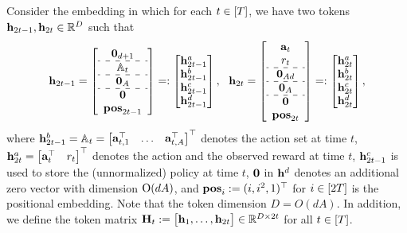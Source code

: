 Consider the embedding in which for each $t\in[{T}]$, we have two tokens ${\mathbf h}_{2t-1},{\mathbf h}_{2t}\in\mathbb{R}^D$ such that
\[
\begin{aligned}
\bh_{2t-1}=
\left[
\begin{array}{c}
     \bzero_{d+1} \\
     \hdashline
     \sA_t\\
     \hdashline
     \bzero_A\\
     \hdashline
      \bzero\\ \posv_{2t-1}
\end{array}
\right]
=:
\begin{bmatrix}
     \bh_{2t-1}^{\parta} \\  \bh_{2t-1}^{\partb}\\  \bh_{2t-1}^{\partc}\\   \bh_{2t-1}^{\partd}\\
\end{bmatrix},~~
\bh_{2t}=
\left[
\begin{array}{cc}
     \ba_{t} \\
      r_t\\
      \hdashline
       \bzero_{Ad}\\
       \hdashline
       \bzero_{A}\\
       \hdashline
       \bzero\\ \posv_{2t}
\end{array}
\right]=:
\begin{bmatrix}
    \bh_{2t}^{\parta} \\  \bh_{2t}^{\partb}\\   \bh_{2t}^{\partc}\\   \bh_{2t}^{\partd}
\end{bmatrix},
\end{aligned}
\]
where ${\mathbf h}_{2t-1}^{{b}}={\mathbb{A}}_t=\begin{bmatrix}
    {\mathbf a}_{t,1}^\top &\ldots & {\mathbf a}_{t,A}^\top
\end{bmatrix}^\top$ denotes the action set at time $t$, ${\mathbf h}_{2t}^{{a}}=\begin{bmatrix}
    {\mathbf a}_t^\top &r_t
\end{bmatrix}^\top$ denotes the action and the observed reward at time $t$, ${\mathbf h}^{c}_{2t-1}$ is used to store the (unnormalized) policy at time  $t$, ${\mathbf 0}$ in ${\mathbf h}^{d}$ denotes an additional zero vector with  dimension ${\mathrm{O}}(dA)$, and ${\mathbf{pos}}_i:=(i,i^2,1)^\top$ for $i\in[2{T}]$ is the positional embedding.    Note that the token dimension $D= O(dA)$. In addition, we define the token matrix ${\mathbf H}_t:=\begin{bmatrix}
    {\mathbf h}_1,\ldots,{\mathbf h}_{2t}
\end{bmatrix}\in\mathbb{R}^{D\times 2t}$ for all $t\in[{T}]$.





